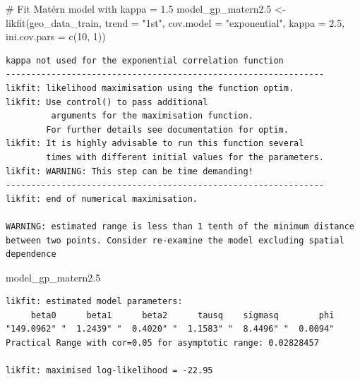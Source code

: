 \documentclass[
  11pt,
]{article}
\newenvironment{Shaded}{\begin{snugshade}}{\end{snugshade}}
\newcommand{\AttributeTok}[1]{\textcolor[rgb]{0.40,0.45,0.13}{#1}}
\newcommand{\CommentTok}[1]{\textcolor[rgb]{0.37,0.37,0.37}{#1}}
\newcommand{\DecValTok}[1]{\textcolor[rgb]{0.68,0.00,0.00}{#1}}
\newcommand{\FloatTok}[1]{\textcolor[rgb]{0.68,0.00,0.00}{#1}}
\newcommand{\FunctionTok}[1]{\textcolor[rgb]{0.28,0.35,0.67}{#1}}
\newcommand{\NormalTok}[1]{\textcolor[rgb]{0.00,0.23,0.31}{#1}}
\newcommand{\OtherTok}[1]{\textcolor[rgb]{0.00,0.23,0.31}{#1}}
\newcommand{\StringTok}[1]{\textcolor[rgb]{0.13,0.47,0.30}{#1}}
\begin{document}
\begin{Shaded}
\begin{Highlighting}[]
\CommentTok{\# Fit Matérn model with kappa = 1.5}
\NormalTok{model\_gp\_matern2}\FloatTok{.5} \OtherTok{\textless{}{-}} \FunctionTok{likfit}\NormalTok{(geo\_data\_train, }\AttributeTok{trend =} \StringTok{"1st"}\NormalTok{, }\AttributeTok{cov.model =} \StringTok{"exponential"}\NormalTok{, }\AttributeTok{kappa =} \FloatTok{2.5}\NormalTok{, }\AttributeTok{ini.cov.pars =} \FunctionTok{c}\NormalTok{(}\DecValTok{10}\NormalTok{, }\DecValTok{1}\NormalTok{))}
\end{Highlighting}
\end{Shaded}

\begin{verbatim}
kappa not used for the exponential correlation function
---------------------------------------------------------------
likfit: likelihood maximisation using the function optim.
likfit: Use control() to pass additional
         arguments for the maximisation function.
        For further details see documentation for optim.
likfit: It is highly advisable to run this function several
        times with different initial values for the parameters.
likfit: WARNING: This step can be time demanding!
---------------------------------------------------------------
likfit: end of numerical maximisation.

WARNING: estimated range is less than 1 tenth of the minimum distance between two points. Consider re-examine the model excluding spatial dependence
\end{verbatim}

\begin{Shaded}
\begin{Highlighting}[]
\NormalTok{model\_gp\_matern2}\FloatTok{.5}
\end{Highlighting}
\end{Shaded}

\begin{verbatim}
likfit: estimated model parameters:
     beta0      beta1      beta2      tausq    sigmasq        phi 
"149.0962" "  1.2439" "  0.4020" "  1.1583" "  8.4496" "  0.0094" 
Practical Range with cor=0.05 for asymptotic range: 0.02828457

likfit: maximised log-likelihood = -22.95
\end{verbatim}
\end{document}

